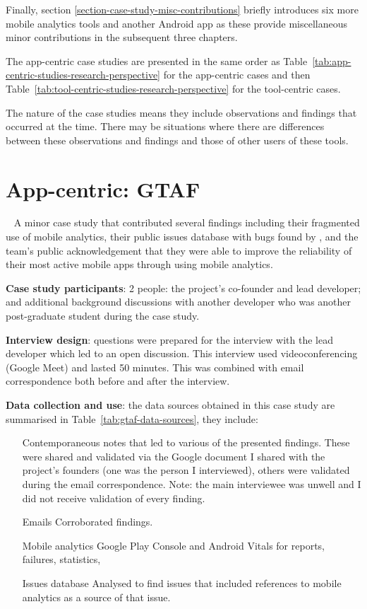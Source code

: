 Finally, section \ref{section-case-study-misc-contributions} briefly introduces six more mobile analytics tools and another Android app as these provide miscellaneous minor contributions in the subsequent three chapters.
    
The app-centric case studies are presented in the same order as Table~\ref{tab:app-centric-studies-research-perspective} for the app-centric cases and then Table~\ref{tab:tool-centric-studies-research-perspective} for the tool-centric cases. 

The nature of the case studies means they include observations and findings that occurred at the time. There may be situations where there are differences between these observations and findings and those of other users of these tools. 
\clearpage




\section{App-centric: GTAF}~\label{case-study-overview-gtaf}
A minor case study that contributed several findings including their fragmented use of mobile analytics, their public issues database with bugs found by , and the team's public acknowledgement that they were able to improve the reliability of their most active mobile apps through using mobile analytics.  

\textbf{Case study participants}: 2 people: the project's co-founder and lead developer; and additional background discussions with another developer who was another post-graduate student during the case study. 

\textbf{Interview design}: questions were prepared for the interview with the lead developer which led to an open discussion. This interview used videoconferencing (Google Meet) and lasted 50 minutes. This was combined with email correspondence both before and after the interview.

\textbf{Data collection and use}: the data sources obtained in this case study are summarised in Table~\ref{tab:gtaf-data-sources}, they include:  

\begin{itemize}
    \item[Contemporaneous notes] that led to various of the presented findings. These were shared and validated via the Google document I shared with the project's founders (one was the person I interviewed), others were validated during the email correspondence. Note: the main interviewee was unwell and I did not receive validation of every finding. 
    \item[Emails] Corroborated findings.
    \item[Mobile analytics] Google Play Console and Android Vitals for reports, failures, statistics,
    \item[Issues database] Analysed to find issues that included references to mobile analytics as a source of that issue.
\end{itemize}

